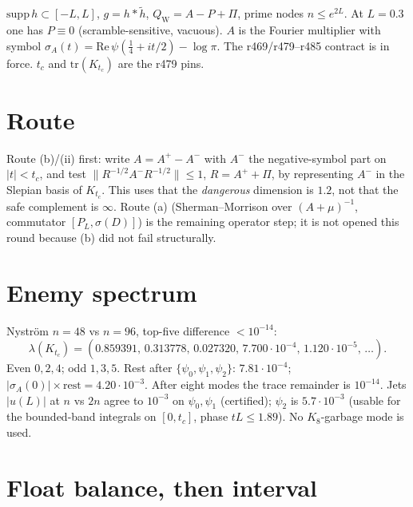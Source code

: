 \documentclass[11pt]{article}
\theoremstyle{remark}
\newcommand{\QW}{Q_{\mathrm W}}
\begin{document}
$\mathrm{supp}\,h\subset[-L,L]$, $g=h*\widetilde h$,
$\QW=A-P+\Pi$, prime nodes $n\le e^{2L}$.
At $L=0.3$ one has $P\equiv0$ (scramble-sensitive,
vacuous).
$A$ is the Fourier multiplier with symbol
$\sigma_A(t)=\mathrm{Re}\,\psi(\tfrac14+it/2)-\log\pi$.
The r469/r479--r485 contract is in force.
$t_c$ and $\mathrm{tr}(K_{t_c})$ are the r479 pins.

\section{Route}

Route (b)/(ii) first: write
$A=A^+-A^-$ with $A^-$ the negative-symbol part on
$|t|<t_c$, and test
$\|R^{-1/2}A^-R^{-1/2}\|\le1$,
$R=A^++\Pi$, by representing $A^-$ in the
Slepian basis of $K_{t_c}$.
This uses that the \emph{dangerous} dimension is
$1.2$, not that the safe complement is $\infty$.
Route (a) (Sherman--Morrison over
$(A+\mu)^{-1}$, commutator $[P_L,\sigma(D)]$)
is the remaining operator step; it is not opened
this round because (b) did not fail structurally.

\section{Enemy spectrum}

Nystr\"om $n=48$ vs $n=96$, top-five difference
$<10^{-14}$:
\[
\lambda(K_{t_c})
=(0.859391,\,0.313778,\,0.027320,\,7.700\cdot10^{-4},\,
1.120\cdot10^{-5},\,\dots).
\]
Even $0,2,4$; odd $1,3,5$.
Rest after $\{\psi_0,\psi_1,\psi_2\}$:
$7.81\cdot10^{-4}$;
$|\sigma_A(0)|\times\mathrm{rest}=4.20\cdot10^{-3}$.
After eight modes the trace remainder is
$10^{-14}$.
Jets $|u(L)|$ at $n$ vs $2n$ agree to $10^{-3}$
on $\psi_0,\psi_1$ (certified);
$\psi_2$ is $5.7\cdot10^{-3}$ (usable for the
bounded-band integrals on $[0,t_c]$, phase
$tL\le1.89$).
No $K_8$-garbage mode is used.

\section{Float balance, then interval}
\end{document}
